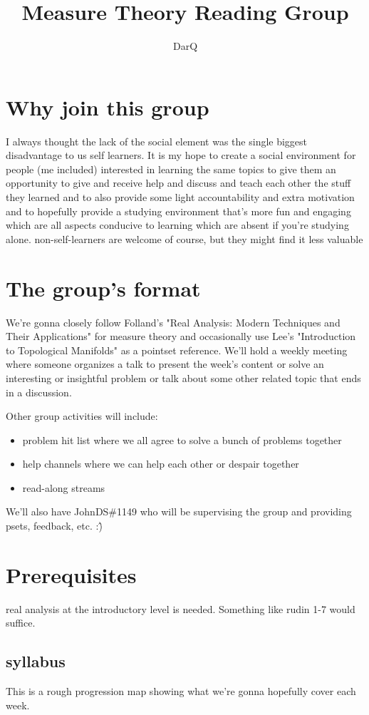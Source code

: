\documentclass{article}
\title{Measure Theory Reading Group}
\author{DarQ}
\begin{document}
\maketitle

\section{Why join this group}
I always thought the lack of the social element was the single biggest disadvantage to us self learners. It is my hope to create a social environment for people (me included) interested in learning the same topics to give them an opportunity to give and receive help and discuss and teach each other the stuff they learned and to also provide some light accountability and extra motivation and to hopefully provide a studying environment that's more fun and engaging which are all aspects conducive to learning which are absent if you're studying alone.
non-self-learners are welcome of course, but they might find it less valuable

\section{The group's format}
We're gonna closely follow Folland's "Real Analysis: Modern Techniques and Their Applications" for measure theory and occasionally use Lee's "Introduction to Topological Manifolds" as a pointset reference. We'll hold a weekly meeting where someone organizes a talk to present the week's content or solve an interesting or insightful problem or talk about some other related topic that ends in a discussion.

Other group activities will include:
\begin{itemize}
    \item problem hit list where we all agree to solve a bunch of problems together
    \item help channels where we can help each other or despair together
    \item read-along streams
\end{itemize}
We'll also have JohnDS\#1149 who will be supervising the group and providing psets, feedback, etc. :\^)
\section{Prerequisites}
real analysis at the introductory level is needed. Something like rudin 1-7 would suffice.
\iffalse
\subsection{syllabus}
This is a rough progression map showing what we're gonna hopefully cover each week.
\end{document}

